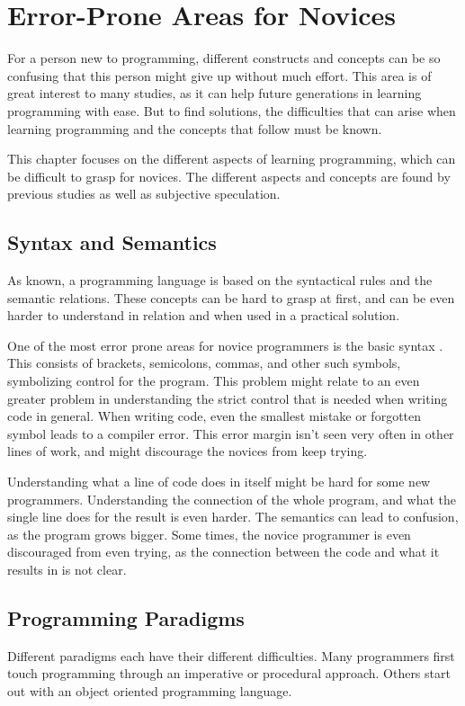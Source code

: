 \chapter{Error-Prone Areas for Novices}
\label{chap:error-prone_areas_for_novices}
For a person new to programming, different constructs and concepts can be so confusing that this person might give up without much effort. This area is of great interest to many studies, as it can help future generations in learning programming with ease. But to find solutions, the difficulties that can arise when learning programming and the concepts that follow must be known.

This chapter focuses on the different aspects of learning programming, which can be difficult to grasp for novices. The different aspects and concepts are found by previous studies as well as subjective speculation.

\section{Syntax and Semantics}
As known, a programming language is based on the syntactical rules and the semantic relations. These concepts can be hard to grasp at first, and can be even harder to understand in relation and when used in a practical solution.

One of the most error prone areas for novice programmers is the basic syntax \cite{Garner05}. This consists of brackets, semicolons, commas, and other such symbols, symbolizing control for the program. This problem might relate to an even greater problem in understanding the strict control that is needed when writing code in general. When writing code, even the smallest mistake or forgotten symbol leads to a compiler error. This error margin isn't seen very often in other lines of work, and might discourage the novices from keep trying.

Understanding what a line of code does in itself might be hard for some new programmers. Understanding the connection of the whole program, and what the single line does for the result is even harder. The semantics can lead to confusion, as the program grows bigger. Some times, the novice programmer is even discouraged from even trying, as the connection between the code and what it results in is not clear.


\section{Programming Paradigms}
Different paradigms each have their different difficulties. Many programmers first touch programming through an imperative or procedural approach. Others start out with an object oriented programming language. 


